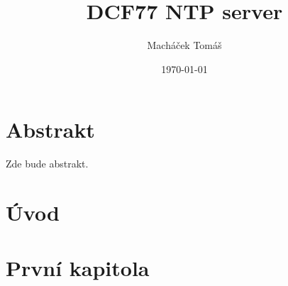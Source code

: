 \documentclass[12pt]{report}
\title{DCF77 NTP server}
\author{Macháček Tomáš}
\date{\today}
\begin{document}


\chapter{Abstrakt}
    Zde bude abstrakt.

\tableofcontents

\chapter{Úvod}


\chapter{První kapitola}

\end{document}

